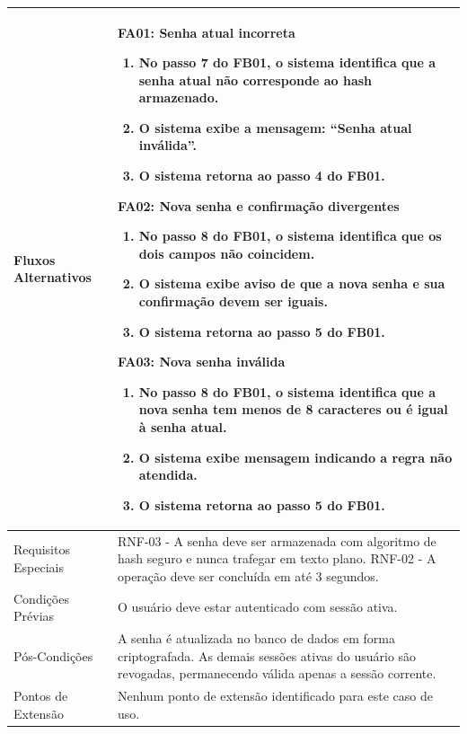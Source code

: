 \begin{longtable}{ >{\raggedright}p{2.8cm} | >{\raggedright\arraybackslash}p{10.7cm} }
Fluxos Alternativos & \mbox{}
\textbf{FA01:} Senha atual incorreta
\vspace{2pt}
\begin{enumerate}[nosep,leftmargin=1.2em,topsep=0pt,partopsep=0pt,parsep=0pt,itemsep=0pt,after=\vspace{2pt}]
    \item No passo 7 do FB01, o sistema identifica que a senha atual não corresponde ao hash armazenado.
    \item O sistema exibe a mensagem: ``Senha atual inválida''.
    \item O sistema retorna ao passo 4 do FB01.
\end{enumerate}

\textbf{FA02:} Nova senha e confirmação divergentes
\vspace{2pt}
\begin{enumerate}[nosep,leftmargin=1.2em,topsep=0pt,partopsep=0pt,parsep=0pt,itemsep=0pt,after=\vspace{2pt}]
    \item No passo 8 do FB01, o sistema identifica que os dois campos não coincidem.
    \item O sistema exibe aviso de que a nova senha e sua confirmação devem ser iguais.
    \item O sistema retorna ao passo 5 do FB01.
\end{enumerate}

\textbf{FA03:} Nova senha inválida
\vspace{2pt}
\begin{enumerate}[nosep,leftmargin=1.2em,topsep=0pt,partopsep=0pt,parsep=0pt,itemsep=0pt,after=\vspace{2pt}]
    \item No passo 8 do FB01, o sistema identifica que a nova senha tem menos de 8 caracteres ou é igual à senha atual.
    \item O sistema exibe mensagem indicando a regra não atendida.
    \item O sistema retorna ao passo 5 do FB01.
\end{enumerate}
\mbox{} \\ \hline

Requisitos Especiais & RNF-03 - A senha deve ser armazenada com algoritmo de hash seguro e nunca trafegar em texto plano. RNF-02 - A operação deve ser concluída em até 3 segundos. \\ \hline

Condições Prévias & O usuário deve estar autenticado com sessão ativa. \\ \hline

Pós-Condições & A senha é atualizada no banco de dados em forma criptografada. As demais sessões ativas do usuário são revogadas, permanecendo válida apenas a sessão corrente. \\ \hline

Pontos de Extensão & Nenhum ponto de extensão identificado para este caso de uso. \\
\end{longtable}
\renewcommand{\arraystretch}{1}
\FloatBarrier



